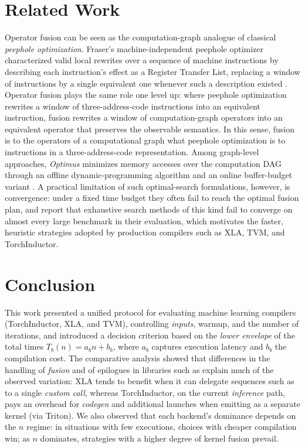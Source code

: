 \documentclass[sigconf,anonymous]{acmart}
\newcommand{\tcode}[1]{\texttt{\seqsplit{#1}}}
\begin{document}
\section{Related Work}
\label{sec:related}

Operator fusion can be seen as the computation-graph analogue of classical \emph{peephole optimization}. Fraser's machine-independent peephole optimizer characterized valid local rewrites over a sequence of machine instructions by describing each instruction's effect as a Register Transfer List, replacing a window of instructions by a single equivalent one whenever such a description existed \cite{fraser1979peephole}. Operator fusion plays the same role one level up: where peephole optimization rewrites a window of three-address-code instructions into an equivalent instruction, fusion rewrites a window of computation-graph operators into an equivalent operator that preserves the observable semantics. In this sense, fusion is to the operators of a computational graph what peephole optimization is to instructions in a three-address-code representation. Among graph-level approaches, \emph{Optimus} minimizes memory accesses over the computation DAG through an offline dynamic-programming algorithm and an online buffer-budget variant \cite{cai2022optimus}. A practical limitation of such optimal-search formulations, however, is convergence: under a fixed time budget they often fail to reach the optimal fusion plan, and \citet{canesche2025xnnc} report that exhaustive search methods of this kind fail to converge on almost every large benchmark in their evaluation, which motivates the faster, heuristic strategies adopted by production compilers such as XLA, TVM, and TorchInductor.

\section{Conclusion}

This work presented a unified protocol for evaluating machine learning compilers (TorchInductor, XLA, and TVM), controlling \emph{inputs}, warmup, and the number of iterations, and introduced a decision criterion based on the \emph{lower envelope} of the total times \(T_b(n)=a_b n + b_b\), where \(a_b\) captures execution latency and \(b_b\) the compilation cost. The comparative analysis showed that differences in the handling of \emph{fusion} and of epilogues in libraries such as \tcode{cuDNN} explain much of the observed variation: XLA tends to benefit when it can delegate sequences such as \tcode{Conv+BatchNorm+ReLU} to a single \emph{custom call}, whereas TorchInductor, on the current \emph{inference} path, pays an overhead for \emph{codegen} and additional launches when emitting \tcode{BN+ReLU} as a separate kernel (via Triton). We also observed that each backend's dominance depends on the \(n\) regime: in situations with few executions, choices with cheaper compilation win; as \(n\) dominates, strategies with a higher degree of kernel fusion prevail.
\end{document}

